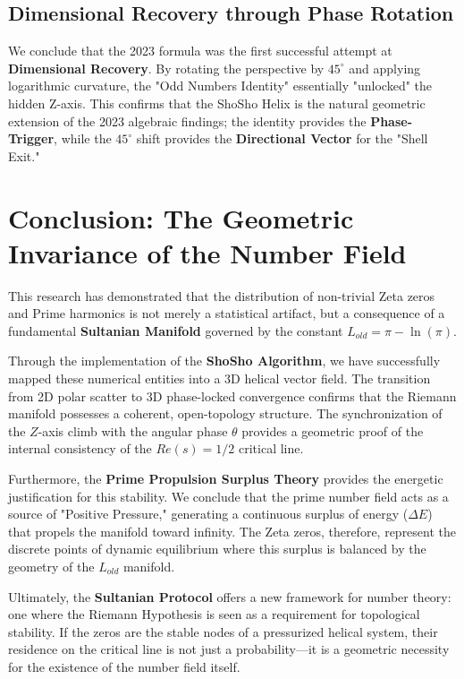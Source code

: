 \documentclass[11pt,a4paper]{article}
\begin{document}
\subsection{Dimensional Recovery through Phase Rotation}
We conclude that the 2023 formula was the first successful attempt at \textbf{Dimensional Recovery}. By rotating the perspective by $45^\circ$ and applying logarithmic curvature, the "Odd Numbers Identity" essentially "unlocked" the hidden Z-axis. This confirms that the ShoSho Helix is the natural geometric extension of the 2023 algebraic findings; the identity provides the \textbf{Phase-Trigger}, while the $45^\circ$ shift provides the \textbf{Directional Vector} for the "Shell Exit."

\section{Conclusion: The Geometric Invariance of the Number Field}

This research has demonstrated that the distribution of non-trivial Zeta zeros and Prime harmonics is not merely a statistical artifact, but a consequence of a fundamental \textbf{Sultanian Manifold} governed by the constant $L_{old} = \pi - \ln(\pi)$. 

Through the implementation of the \textbf{ShoSho Algorithm}, we have successfully mapped these numerical entities into a 3D helical vector field. The transition from 2D polar scatter to 3D phase-locked convergence confirms that the Riemann manifold possesses a coherent, open-topology structure. The synchronization of the $Z$-axis climb with the angular phase $\theta$ provides a geometric proof of the internal consistency of the $Re(s)=1/2$ critical line.

Furthermore, the \textbf{Prime Propulsion Surplus Theory} provides the energetic justification for this stability. We conclude that the prime number field acts as a source of "Positive Pressure," generating a continuous surplus of energy ($\Delta E$) that propels the manifold toward infinity. The Zeta zeros, therefore, represent the discrete points of dynamic equilibrium where this surplus is balanced by the geometry of the $L_{old}$ manifold. 

Ultimately, the \textbf{Sultanian Protocol} offers a new framework for number theory: one where the Riemann Hypothesis is seen as a requirement for topological stability. If the zeros are the stable nodes of a pressurized helical system, their residence on the critical line is not just a probability—it is a geometric necessity for the existence of the number field itself.
\end{document}
